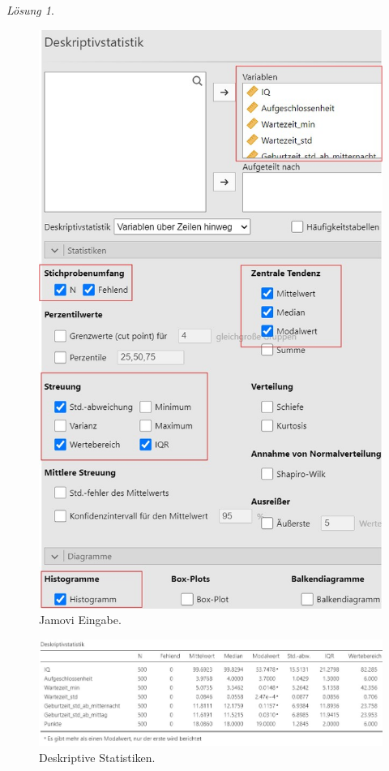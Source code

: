 \documentclass[
]{book}
\theoremstyle{definition}
\theoremstyle{definition}
\theoremstyle{definition}
\theoremstyle{definition}
\theoremstyle{remark}
\newtheorem*{solution}{Lösung}
\begin{document}
\begin{solution}
\leavevmode

\begin{figure}
\includegraphics[width=1\linewidth]{figures/02-exr-diverse-distrib-input} \caption{Jamovi Eingabe.}\label{fig:sol-diverse-distrib1}
\end{figure}

\begin{figure}
\includegraphics[width=1\linewidth]{figures/02-exr-diverse-distrib-output} \caption{Deskriptive Statistiken.}\label{fig:sol-diverse-distrib2}
\end{figure}


\end{solution}
\end{document}
